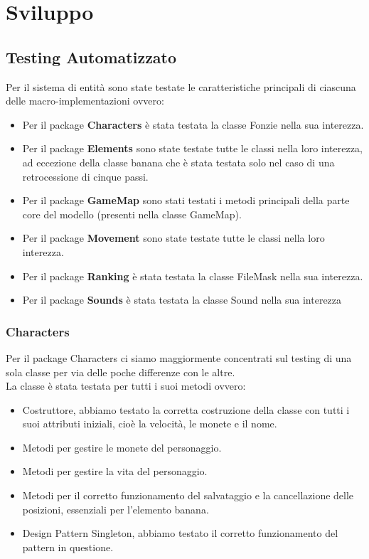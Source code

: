 \documentclass[12pt, letterpaper]{article}
\begin{document}
\section{Sviluppo}
    \subsection{Testing Automatizzato}
        Per il sistema di entità sono state testate le caratteristiche principali di
        ciascuna delle macro-implementazioni ovvero:
            \begin{itemize}
                \item Per il package \textbf{Characters} è stata testata la classe Fonzie nella sua interezza.
                \item  Per il package \textbf{Elements} sono state testate tutte le classi nella loro interezza, ad eccezione della classe banana che è stata testata solo nel caso di una retrocessione di cinque passi.
                \item Per il package \textbf{GameMap} sono stati testati i metodi principali della parte core del modello (presenti nella classe GameMap).
                \item Per il package \textbf{Movement} sono state testate tutte le classi nella loro interezza.
                \item Per il package \textbf{Ranking} è stata testata la classe FileMask nella sua interezza.
                \item Per il package \textbf{Sounds} è stata testata la classe Sound nella sua interezza
            \end{itemize}
        \subsubsection{Characters}
            Per il package Characters ci siamo maggiormente concentrati sul testing di una sola classe per via delle poche differenze con le altre.\\
            La classe è stata testata per tutti i suoi metodi ovvero:
                \begin{itemize}
                    \item Costruttore, abbiamo testato la corretta costruzione della classe con tutti i suoi attributi iniziali, cioè la velocità, le monete e il nome.
                    \item Metodi per gestire le monete del personaggio.
                    \item Metodi per gestire la vita del personaggio.
                    \item Metodi per il corretto funzionamento del salvataggio e la cancellazione delle posizioni, essenziali per l'elemento banana.
                    \item Design Pattern Singleton, abbiamo testato il corretto funzionamento del pattern in questione.
                \end{itemize}
\end{document}
